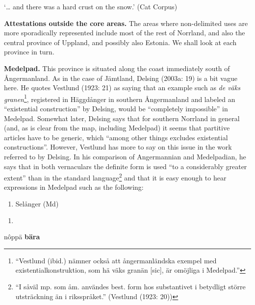 ‘… and there was a hard crust on the snow.’ (Cat Corpus)
\z


\textbf{Attestations outside the core areas.} The areas where non-delimited uses are more sporadically represented include most of the rest of Norrland, and also the central province of Uppland, and possibly also Estonia. We shall look at each province in turn.

\textbf{Medelpad.} This province is situated along the coast immediately south of Ångermanland. As in the case of Jämtland, Delsing (2003a: 19) is a bit vague here. He quotes Vestlund (1923: 21) as saying that an example such as \textit{de väks granen}\footnote{ “Vestlund (ibid.) nämner också att ångermanländska exempel med existentialkonstruktion, som hä väks granän [sic], är omöjliga i Medelpad.”}, registered in Häggdånger in southern Ångermanland and labeled an “existential construction” by Delsing, would be “completely impossible” in Medelpad. Somewhat later, Delsing says that for southern Norrland in general (and, as is clear from the map, including Medelpad) it seems that partitive articles have to be generic, which “among other things excludes existential constructions”. However, Vestlund has more to say on this issue in the work referred to by Delsing. In his comparison of Angermannian and Medelpadian, he says that in both vernaculars the definite form is used “to a considerably greater extent” than in the standard language\footnote{ “I såväl mp. som åm. användes best. form hos substantivet i betydligt större utsträckning än i riksspråket.” (Vestlund (1923: 20))} and that it is easy enough to hear expressions in Medelpad such as the following:

\begin{enumerate} %
\item 
Selånger (Md)

\end{enumerate} %
\setcounter{listLFOxcviiileveli}{0}
\begin{enumerate} %
\item 
\end{enumerate} %
\ea\label{}
\gll nôppä  \textbf{bära}\\


